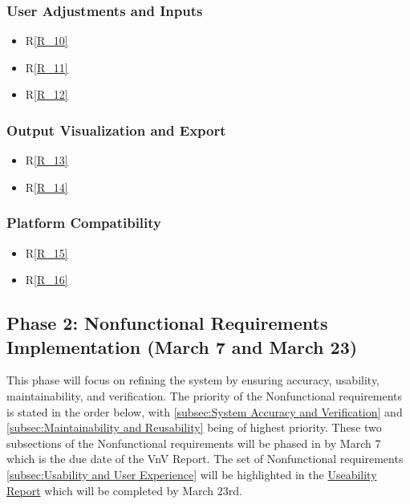 \documentclass[12pt]{article}
\begin{document}
  \subsubsection{User Adjustments and Inputs}
  \label{subsec:User Adjustments and Inputs}
  \begin{itemize}
      \item R\ref{R_10}
      \item R\ref{R_11}
      \item R\ref{R_12}
  \end{itemize}

  \subsubsection{Output Visualization and Export}
  \begin{itemize}
      \item R\ref{R_13}
      \item R\ref{R_14}
  \end{itemize}
  
  \subsubsection{Platform Compatibility}
  \begin{itemize}
      \item R\ref{R_15}
      \item R\ref{R_16}
  \end{itemize}
  
  \subsection{Phase 2: Nonfunctional Requirements Implementation (March 7 and March 23) }
  
  This phase will focus on refining the system by ensuring accuracy, usability, maintainability, and verification.
  The priority of the Nonfunctional requirements is stated in the order below, with \ref{subsec:System Accuracy and Verification} and \ref{subsec:Maintainability and Reusability} being of highest priority.
  These two subsections of the Nonfunctional requirements will be phased in by March 7 which is the due date of the VnV Report. 
  The set of Nonfunctional requirements \ref{subsec:Usability and User Experience} will be highlighted in the \href{https://github.com/gr812b/CVT-Simulator/blob/main/docs/UsabilityReport/UsabilityReport.pdf}{Useability Report} which will be completed by March 23rd.
  
\end{document}
